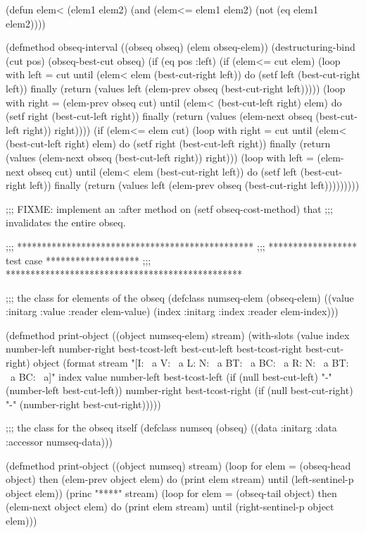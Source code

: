 (defun elem< (elem1 elem2)
  (and (elem<= elem1 elem2) (not (eq elem1 elem2))))

(defmethod obseq-interval ((obseq obseq) (elem obseq-elem))
  (destructuring-bind (cut pos) (obseq-best-cut obseq)
    (if (eq pos :left)
	(if (elem<= cut elem)
	    (loop with left = cut
		  until (elem< elem (best-cut-right left))
		  do (setf left (best-cut-right left))
		  finally (return (values left (elem-prev obseq (best-cut-right left)))))
	    (loop with right = (elem-prev obseq cut)
		  until (elem< (best-cut-left right) elem)
		  do (setf right (best-cut-left right))
		  finally (return (values (elem-next obseq (best-cut-left right)) right))))
	(if (elem<= elem cut)
	    (loop with right = cut
		  until (elem< (best-cut-left right) elem)
		  do (setf right (best-cut-left right))
		  finally (return (values (elem-next obseq (best-cut-left right)) right)))
	    (loop with left = (elem-next obseq cut)
		  until (elem< elem (best-cut-right left))
		  do (setf left (best-cut-right left))
		  finally (return (values left (elem-prev obseq (best-cut-right left)))))))))

;;; FIXME: implement an :after method on (setf obseq-cost-method) that
;;; invalidates the entire obseq. 

;;; ************************************************
;;; ****************** test case *******************
;;; ************************************************

;;; the class for elements of the obseq
(defclass numseq-elem (obseq-elem)
  ((value :initarg :value :reader elem-value)
   (index :initarg :index :reader elem-index)))

(defmethod print-object ((object numseq-elem) stream)
  (with-slots (value index number-left number-right
		     best-tcost-left best-cut-left
		     best-tcost-right best-cut-right) object
    (format stream
	    "[I: ~a V: ~a {L: N: ~a BT: ~a BC: ~a} {R: N: ~a BT: ~a BC: ~a}]"
	    index value
	    number-left
	    best-tcost-left (if (null best-cut-left) "-" (number-left best-cut-left))
	    number-right
	    best-tcost-right (if (null best-cut-right) "-" (number-right best-cut-right)))))

;;; the class for the obseq itself
(defclass numseq (obseq)
  ((data :initarg :data :accessor numseq-data)))

(defmethod print-object ((object numseq) stream)
  (loop for elem = (obseq-head object) then (elem-prev object elem)
	do (print elem stream)
	until (left-sentinel-p object elem))
  (princ "****" stream)
  (loop for elem = (obseq-tail object) then (elem-next object elem)
	do (print elem stream)
	until (right-sentinel-p object elem)))

